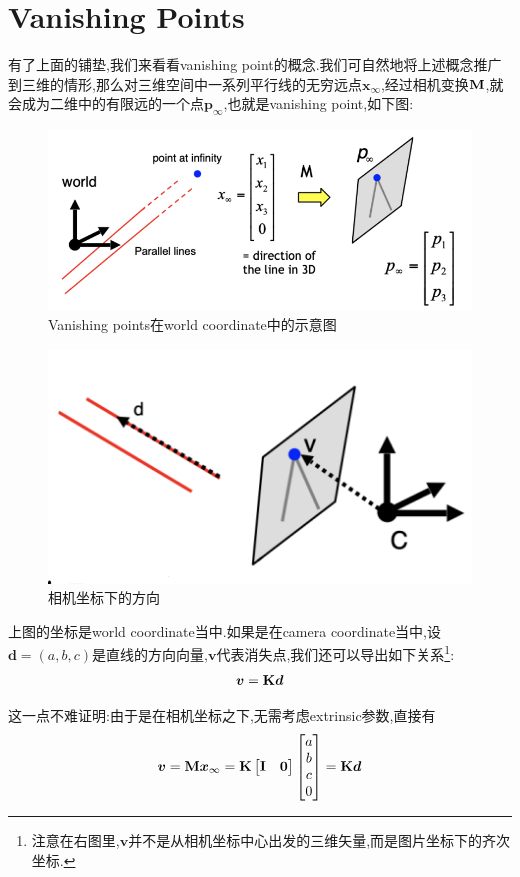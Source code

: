 \section{Vanishing Points}

有了上面的铺垫,我们来看看vanishing point的概念.我们可自然地将上述概念推广到三维的情形,那么对三维空间中一系列平行线的无穷远点$\bm x_\infty$,经过相机变换$\bold{M}$,就会成为二维中的有限远的一个点$\bm p_\infty$,也就是vanishing point,如下图:
\begin{figure}[htbp]
	\centering
	\includegraphics[scale=0.65]{figures/vanishingpoints.png}
	\caption{Vanishing points在world coordinate中的示意图}
	\label{}
\end{figure}

\begin{figure}
	\includegraphics[scale=0.5]{figures/vpanddir.png}
	\caption{相机坐标下的方向}
\end{figure}
上图的坐标是world coordinate当中.如果是在camera coordinate当中,设$\bm d = (a, b, c)$是直线的方向向量,$\bm v$代表消失点,我们还可以导出如下关系\footnote{注意在右图里,$\bm v$并不是从相机坐标中心出发的三维矢量,而是图片坐标下的齐次坐标.}:
\begin{equation}
	\bm v = \bold{K} \bm d
\end{equation}


这一点不难证明:由于是在相机坐标之下,无需考虑extrinsic参数,直接有
\begin{equation}
	\bm v = \bold{M} \bm x_\infty = \bold{K} 
	\begin{bmatrix}
		\bold{I} & \bm 0
	\end{bmatrix}
	\begin{bmatrix}
		a\\b\\c\\0
	\end{bmatrix} = \bold{K} \bm d
\end{equation}


